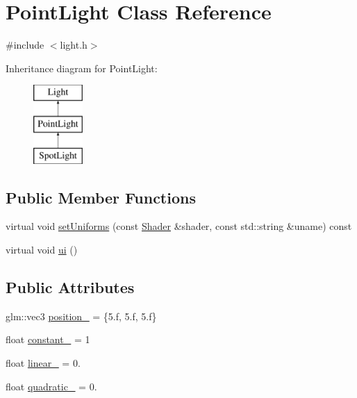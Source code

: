 \hypertarget{classPointLight}{}\section{Point\+Light Class Reference}
\label{classPointLight}


{\ttfamily \#include $<$light.\+h$>$}

Inheritance diagram for Point\+Light\+:\begin{figure}[H]
\begin{center}
\leavevmode
\includegraphics[height=3.000000cm]{classPointLight}
\end{center}
\end{figure}
\subsection*{Public Member Functions}
\begin{DoxyCompactItemize}
\item 
virtual void \hyperlink{classPointLight_abf6f298a0d04b636e22a3a5903e5b823}{set\+Uniforms} (const \hyperlink{classShader}{Shader} \&shader, const std\+::string \&uname) const
\item 
virtual void \hyperlink{classPointLight_a538a42e0d1d713c57e46e492d352b34e}{ui} ()
\end{DoxyCompactItemize}
\subsection*{Public Attributes}
\begin{DoxyCompactItemize}
\item 
glm\+::vec3 \hyperlink{classPointLight_a6ab3a936be50472a3b5a064edc18f5ce}{position\+\_\+} = \{5.f, 5.f, 5.f\}
\item 
float \hyperlink{classPointLight_ac66b99d54650b57401ae4f7d3c1c22f4}{constant\+\_\+} = 1
\item 
float \hyperlink{classPointLight_a11a41268a4d9e19d45eed18ba1ad8e43}{linear\+\_\+} = 0.
\item 
float \hyperlink{classPointLight_a7adf3997d566c55fb2878db179d4867d}{quadratic\+\_\+} = 0.
\end{DoxyCompactItemize}


